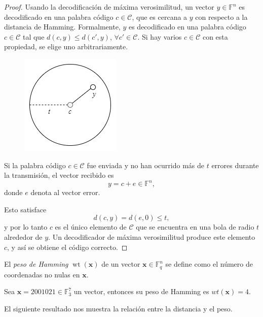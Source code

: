 \begin{proof}
    Usando la decodificación de máxima verosimilitud, un vector $y \in \mathbb{F}^n$ es decodificado en una palabra código $c  \in \mathcal{C}$, que es cercana a $y$ con respecto a la distancia de Hamming. Formalmente, $y$ es decodificado en una palabra código $c \in \mathcal{C}$ tal que $d(c,y) \leq d(c',y)$, $\forall c' \in \mathcal{C}$. Si hay varios $c \in \mathcal{C}$ con esta propiedad, se elige uno arbitrariamente.

    \begin{figure}
        \centering
        \includegraphics[scale=0.5]{figures/Diagrama_decodificacion_maxima_verosimilitud.png}
    \end{figure}

    Si la palabra código $c \in \mathcal{C}$ fue enviada y no han ocurrido más de $t$ errores durante la transmisión, el vector recibido es 
    \[
        y = c + e \in \mathbb{F}^n,
    \]
    donde $e$ denota al vector error.
    
    Esto satisface 
    \[
        d(c,y) = d(e,0) \leq t,
    \]
    y por lo tanto $c$ es el único elemento de $\mathcal{C}$ que se encuentra en una bola de radio $t$ alrededor de $y$. Un decodificador de máxima verosimilitud produce este elemento $c$, y así se obtiene el código correcto.
\end{proof}

\begin{definition}
    El \emph{peso de Hamming} $\operatorname{wt}(\mathbf{x})$ de un vector $\mathbf{x} \in \mathbb{F}_q^n$ se define como el número de coordenadas no nulas en $\mathbf{x}$.
\end{definition}

\begin{exampleth}
    Sea $\mathbf{x} = 2001021 \in \mathbb{F}_3^7$ un vector, entonces su peso de Hamming es $wt(\mathbf{x}) = 4$.
\end{exampleth}

El siguiente resultado nos muestra la relación entre la distancia y el peso.

